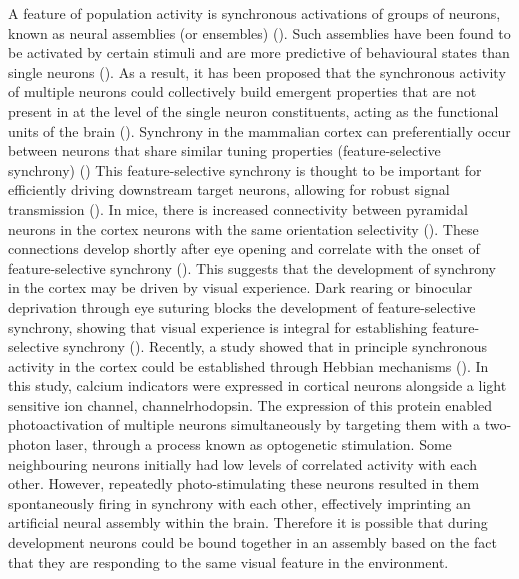 A feature of population activity is synchronous activations of groups of neurons, known as neural assemblies (or ensembles) (\cite{Buzsaki2010, Yuste2015}). Such assemblies have been found to be activated by certain stimuli and are more predictive of behavioural states than single neurons (\cite{Miller2014, Carrillo-Reid2015, Stringer2019SpontaneousActivity,Deolindo2018NeuronalRats, Diana2019BayesianAssemblies}).  As a result, it has been proposed that the synchronous activity of multiple neurons could collectively build emergent properties that are not present in at the level of the single neuron constituents, acting as the functional units of the brain (\cite{Hopfield1982,Yuste2011,Yuste2015,Saxena2019TowardsDoctrine}). Synchrony in the mammalian cortex can preferentially occur between neurons that share similar tuning properties (feature-selective synchrony) (\cite{Gray1989,Denman2014TheMap., Ishikawa2018Experience-dependentCortex}) This feature-selective synchrony is thought to be important for efficiently driving downstream target neurons, allowing for robust signal transmission (\cite{Usrey1999SYNCHRONOUSSYSTEM,Bruno2006CortexSynapses, Ishikawa2018Experience-dependentCortex}). In mice, there is increased connectivity between pyramidal neurons in the cortex neurons with the same orientation selectivity (\cite{Ko2011}). These connections develop shortly after eye opening and correlate with the onset of feature-selective synchrony (\cite{Ko2013, Ishikawa2018Experience-dependentCortex}). This suggests that the development of synchrony in the cortex may be driven by visual experience. Dark rearing or binocular deprivation through eye suturing blocks the development of feature-selective synchrony, showing that visual experience is integral for establishing feature-selective synchrony (\cite{Ishikawa2018Experience-dependentCortex}).  Recently, a study showed that in principle synchronous activity in the cortex could be established through Hebbian mechanisms (\cite{Carrillo-Reid2016}). In this study, calcium indicators were expressed in cortical neurons alongside a light sensitive ion channel, channelrhodopsin. The expression of this protein enabled photoactivation of multiple neurons simultaneously by targeting them with a two-photon laser, through a process known as optogenetic stimulation. Some neighbouring neurons initially had low levels of correlated activity with each other. However,  repeatedly photo-stimulating these neurons resulted in them spontaneously firing in synchrony with each other, effectively imprinting an artificial neural assembly within the brain. Therefore it is possible that during development neurons could be bound together in an assembly based on the fact that they are responding to the same visual feature in the environment.


